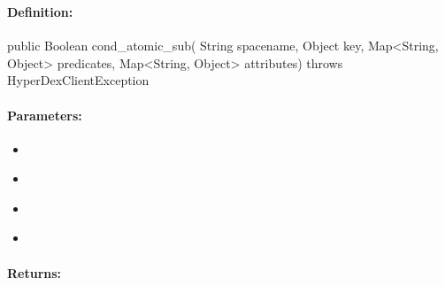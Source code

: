 \subsubsection{}
\label{api:java:cond_atomic_sub}


\paragraph{Definition:}
\begin{javacode}
public Boolean cond_atomic_sub(
        String spacename,
        Object key,
        Map<String, Object> predicates,
        Map<String, Object> attributes) throws HyperDexClientException
\end{javacode}

\paragraph{Parameters:}
\begin{itemize}[noitemsep]
\item {}\\

\item {}\\

\item {}\\

\item {}\\

\end{itemize}

\paragraph{Returns:}


\pagebreak
\subsubsection{}
\label{api:java:async_cond_atomic_sub}


